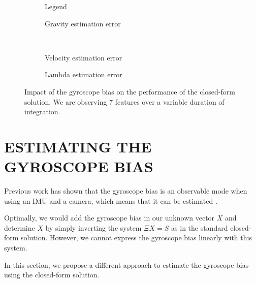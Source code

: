 \documentclass[letterpaper, 10 pt, journal, final]{ieeeconf}  %
\begin{document}
\begin{figure}
  \centering
        \hspace{0.2\columnwidth}%
        \begin{subfigure}[b]{0.3\columnwidth}
                \resizebox{\columnwidth}{!}{}
                \caption{Legend}

        \end{subfigure}%
        \begin{subfigure}[b]{0.5\columnwidth}
                \resizebox{\columnwidth}{!}{}
                \caption{Gravity estimation error}

        \end{subfigure}
        ~
        \begin{subfigure}[b]{0.5\columnwidth}
                \resizebox{\columnwidth}{!}{}
                \caption{Velocity estimation error}

        \end{subfigure}%
        \begin{subfigure}[b]{0.5\columnwidth}
                \resizebox{\columnwidth}{!}{}
                \caption{Lambda estimation error}

        \end{subfigure}
        \caption{Impact of the gyroscope bias on the performance of the closed-form solution. We are observing 7 features over a variable duration of integration. \label{fig:biasGyroCF}}
\end{figure}




\section{ESTIMATING THE GYROSCOPE BIAS}\label{SectionCalibration}

Previous work has shown that the gyroscope bias is an observable mode when using an IMU and a camera, which means that it can be estimated \cite{Martinelli2012}.

Optimally, we would add the gyroscope bias in our unknown vector $X$ and determine $X$ by simply inverting the system $\Xi X = S$ as in the standard closed-form solution.
However, we cannot express the gyroscope bias linearly with this system.

In this section, we propose a different approach to estimate the gyroscope bias using the closed-form solution.
\end{document}
